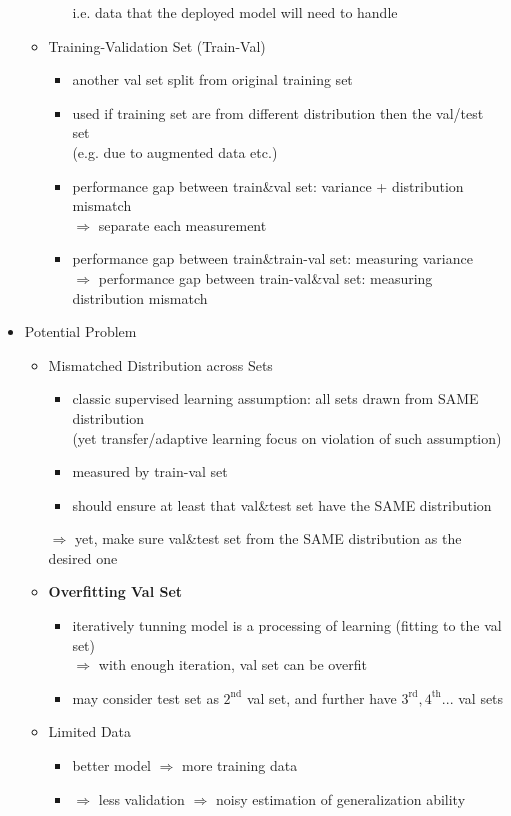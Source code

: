 \begin{itemize}
\begin{itemize}
\begin{itemize}
		i.e. data that the deployed model will need to handle
		\end{itemize}
	\item Training-Validation Set (Train-Val)
		\begin{itemize}
		\item another val set split from original training set
		\item used if training set are from different distribution then the val/test set \\
		(e.g. due to augmented data etc.)
		\item performance gap between train\&val set: variance + distribution mismatch \\
		$\Rightarrow$ separate each measurement
		\item performance gap between train\&train-val set: measuring variance \\
		$\Rightarrow$ performance gap between train-val\&val set: measuring distribution mismatch
		\end{itemize}
	\end{itemize}

\item Potential Problem
	\begin{itemize}
	\item Mismatched Distribution across Sets
		\begin{itemize}
		\item classic supervised learning assumption: all sets drawn from SAME distribution \\
		(yet transfer/adaptive learning focus on violation of such assumption)
		\item measured by train-val set
		\item should ensure at least that val\&test set have the SAME distribution
		\end{itemize}
		$\Rightarrow$ yet, make sure val\&test set from the SAME distribution as the desired one
	\item \textbf{Overfitting Val Set}
		\begin{itemize}
		\item iteratively tunning model is a processing of learning (fitting to the val set) \\
		$\Rightarrow$ with enough iteration, val set can be overfit
		\item may consider test set as $2^\text{nd}$ val set, and further have $3^\text{rd}, 4^\text{th}...$ val sets
		\end{itemize}
	\item Limited Data
		\begin{itemize}
		\item better model $\Rightarrow$ more training data 
		\item $\Rightarrow$ less validation $\Rightarrow$ noisy estimation of generalization ability
		\end{itemize}
	\end{itemize}
\end{itemize}

